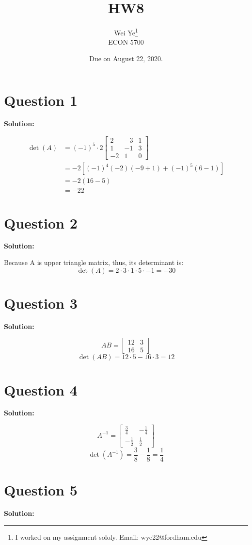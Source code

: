 \documentclass[11pt]{article} %
\title{HW8}
\author{Wei Ye\footnote{I worked on my assignment sololy. Email: wye22@fordham.edu}  	\\
	ECON 5700}
\date{Due on August 22, 2020.}
\begin{document}
	\maketitle
	\section{Question 1}
	\textbf{Solution:}
	
\begin{align*}
	\det(A)&=(-1)^5\cdot 2\begin{bmatrix}
		2&-3&1\\
		1&-1&3\\
		-2&1&0
	\end{bmatrix}\\
&=-2[(-1)^4(-2)(-9+1)+(-1)^5(6-1)]\\
&=-2(16-5)\\
&=-22
\end{align*}

\section{Question 2}
\textbf{Solution:}

Because A is upper triangle matrix, thus, its determinant is:
$$\det(A)=2\cdot 3\cdot 1\cdot 5\cdot -1=-30$$	


\section{Question 3}
\textbf{Solution:}

$$AB=\begin{bmatrix}
	12&3\\16&5
\end{bmatrix}$$
$$\det(AB)=12\cdot 5-16\cdot 3=12$$


\section{Question 4}
\textbf{Solution:}

$$A^{-1}=\begin{bmatrix}
	\frac{3}{4}&-\frac{1}{4}\\
	-\frac{1}{2}&\frac{1}{2}
\end{bmatrix}$$
$$\det(A^{-1})=\frac{3}{8}-\frac{1}{8}=\frac{1}{4}$$


\section{Question 5}
\textbf{Solution:}
\end{document}
